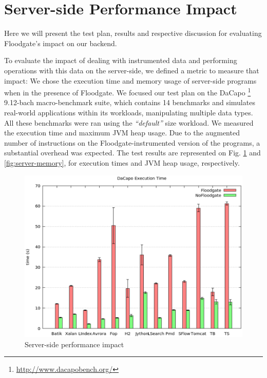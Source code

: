 \section{Server-side Performance Impact}
\label{sec:server-performance}

Here we will present the test plan, results and respective discussion for evaluating Floodgate's impact on our backend.

To evaluate the impact of dealing with instrumented data and performing operations with this data on the server-side, we defined a metric to measure that impact: We chose the execution time and memory usage of server-side programs when in the presence of Floodgate. We focused our test plan on the DaCapo \footnote{\url{http://www.dacapobench.org/}} 9.12-bach macro-benchmark suite, which contains 14 benchmarks and simulates real-world applications within its workloads, manipulating multiple data types. All these benchmarks were ran using the \textit{``default''} size workload. We measured the execution time and maximum JVM heap usage. Due to the augmented number of instructions on the Floodgate-instrumented version of the programs, a substantial overhead was expected.
The test results are represented on Fig. \ref{fig:server-performance} and \ref{fig:server-memory}, for execution times and JVM heap usage, respectively.

\begin{figure}[t!]
\includegraphics[width=\textwidth]{figs/server-performance}
\centering
\caption{Server-side performance impact}
\label{fig:server-performance}
\end{figure}

